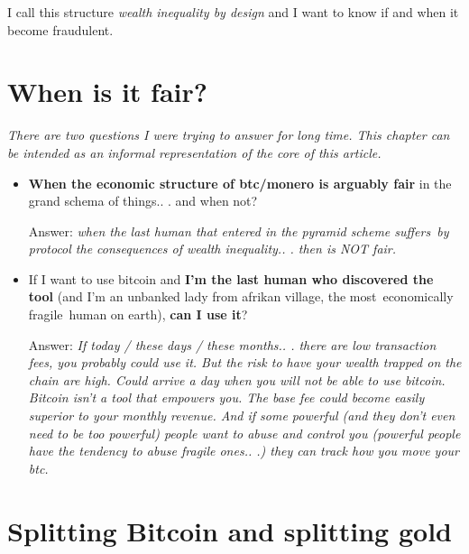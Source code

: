 \documentclass{article}
\begin{document}
I call this structure \emph{wealth inequality by design} and I want to know if and when it become fraudulent. \vspace{0.5cm}


\section{When is it fair?}\vspace{0.3cm}

\emph{There are two questions I were trying to answer for long time. This chapter can be intended as an informal representation of the core of this article.}\vspace{0.5cm}

\begin{itemize}
	\item \textbf{When the economic structure of btc/monero is arguably fair} in the grand schema of things.. . and when not?\vspace{0.2cm}


		Answer: \emph{when the last human that entered in the pyramid scheme suffers by protocol the consequences of wealth inequality.. . then is NOT fair.} \vspace{0.2cm}


	\item If I want to use bitcoin and \textbf{I'm the last human who discovered the tool} (and I'm an unbanked lady from afrikan village, the most economically fragile human on earth), \textbf{can I use it}?\vspace{0.2cm}


		Answer: \emph{If today / these days / these months.. . there are low transaction fees, you probably could use it. But the risk to have your wealth trapped on the chain are high. Could arrive a day when you will not be able to use bitcoin. Bitcoin isn't a tool that empowers you. The base fee could become easily superior to your monthly revenue.
		And if some powerful (and they don't even need to be too powerful) people want to abuse and control you (powerful people have the tendency to abuse fragile ones.. .) they can track how you move your btc.}\vspace{0.5cm}

\end{itemize}



\section{Splitting Bitcoin and splitting gold}\vspace{0.4cm}
\end{document}
